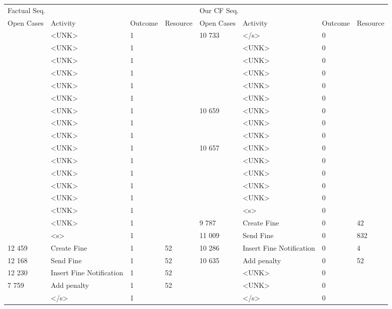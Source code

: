 \begin{tabular}{llllllll}
\toprule
\multicolumn{4}{l}{Factual Seq.} & \multicolumn{4}{l}{Our CF Seq.} \\
Open Cases & Activity & Outcome & Resource & Open Cases & Activity & Outcome & Resource \\
\midrule
 & <UNK> & 1 &  & 10 733 & </s> & 0 &  \\
 & <UNK> & 1 &  &  & <UNK> & 0 &  \\
 & <UNK> & 1 &  &  & <UNK> & 0 &  \\
 & <UNK> & 1 &  &  & <UNK> & 0 &  \\
 & <UNK> & 1 &  &  & <UNK> & 0 &  \\
 & <UNK> & 1 &  &  & <UNK> & 0 &  \\
 & <UNK> & 1 &  & 10 659 & <UNK> & 0 &  \\
 & <UNK> & 1 &  &  & <UNK> & 0 &  \\
 & <UNK> & 1 &  &  & <UNK> & 0 &  \\
 & <UNK> & 1 &  & 10 657 & <UNK> & 0 &  \\
 & <UNK> & 1 &  &  & <UNK> & 0 &  \\
 & <UNK> & 1 &  &  & <UNK> & 0 &  \\
 & <UNK> & 1 &  &  & <UNK> & 0 &  \\
 & <UNK> & 1 &  &  & <UNK> & 0 &  \\
 & <UNK> & 1 &  &  & <s> & 0 &  \\
 & <UNK> & 1 &  & 9 787 & Create Fine & 0 & 42 \\
 & <s> & 1 &  & 11 009 & Send Fine & 0 & 832 \\
12 459 & Create Fine & 1 & 52 & 10 286 & Insert Fine Notification & 0 & 4 \\
12 168 & Send Fine & 1 & 52 & 10 635 & Add penalty & 0 & 52 \\
12 230 & Insert Fine Notification & 1 & 52 &  & <UNK> & 0 &  \\
7 759 & Add penalty & 1 & 52 &  & <UNK> & 0 &  \\
 & </s> & 1 &  &  & </s> & 0 &  \\
\bottomrule
\end{tabular}
